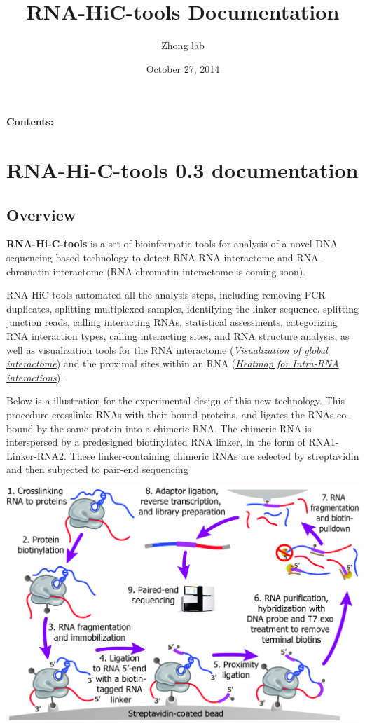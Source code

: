\documentclass[letterpaper,10pt,english]{sphinxmanual}
\title{RNA-HiC-tools Documentation}
\date{October 27, 2014}
\author{Zhong lab}
\begin{document}
\maketitle
\tableofcontents
{}\label{index::doc}


\textbf{Contents:}


\chapter{RNA-Hi-C-tools 0.3 documentation}
\label{RNA-Hi-C-tools:welcome-to-rna-hi-c-tools-s-documentation}\label{RNA-Hi-C-tools::doc}\label{RNA-Hi-C-tools:rna-hi-c-tools-version-documentation}

\section{Overview}
\label{RNA-Hi-C-tools:overview}
\textbf{RNA-Hi-C-tools} is a set of bioinformatic tools for analysis of a novel DNA sequencing based technology to detect RNA-RNA interactome and RNA-chromatin interactome (RNA-chromatin interactome is coming soon).

RNA-HiC-tools automated all the analysis steps, including removing PCR duplicates, splitting multiplexed samples, identifying the linker sequence, splitting junction reads, calling interacting RNAs, statistical assessments, categorizing RNA interaction types, calling interacting sites, and RNA structure analysis, as well as visualization tools for the RNA interactome ({\hyperref[Visualization:visualizationglobal]{\emph{Visualization of global interactome}}}) and the proximal sites within an RNA ({\hyperref[Visualization:visualizationheatmap]{\emph{Heatmap for Intra-RNA interactions}}}).

Below is a illustration for the experimental design of this new technology. This procedure crosslinks RNAs with their bound proteins, and ligates the RNAs co-bound by the same protein into a chimeric RNA. The chimeric RNA is interspersed by a predesigned biotinylated RNA linker, in the form of RNA1-Linker-RNA2. These linker-containing chimeric RNAs are selected by streptavidin and then subjected to pair-end sequencing

{\hfill\includegraphics{exp.jpg}\hfill}
\end{document}
